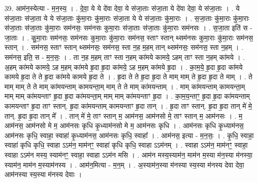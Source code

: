 \documentclass[17pt]{extarticle}
\begin{document}
39. आम॑न॒स्येत्या - म॒न॒स्य॒ । . दे॒वा॒ ये ये दे॑वा देवा॒ ये स॑जा॒ताः स॑जा॒ता ये दे॑वा देवा॒ ये स॑जा॒ताः । . ये स॑जा॒ताः स॑जा॒ता ये ये स॑जा॒ताः कु॑मा॒राः कु॑मा॒राः स॑जा॒ता ये ये स॑जा॒ताः कु॑मा॒राः । . स॒जा॒ताः कु॑मा॒राः कु॑मा॒राः स॑जा॒ताः स॑जा॒ताः कु॑मा॒राः सम॑नसः॒ सम॑नसः कुमा॒राः स॑जा॒ताः स॑जा॒ताः कु॑मा॒राः सम॑नसः । . स॒जा॒ता इति॑ स - जा॒ताः । . कु॒मा॒राः सम॑नसः॒ सम॑नसः कुमा॒राः कु॑मा॒राः सम॑नस॒ स्ताꣳ स्तान् थ्सम॑नसः कुमा॒राः कु॑मा॒राः सम॑नस॒ स्तान् । . सम॑नस॒ स्ताꣳ स्तान् थ्सम॑नसः॒ सम॑नस॒ स्ता न॒ह म॒हम् तान् थ्सम॑नसः॒ सम॑नस॒ स्ता न॒हम् । . सम॑नस॒ इति॒ स - म॒न॒सः॒ । . ता न॒ह म॒हम् ताꣳ स्ता न॒हम् का॑मये कामये॒ ऽहम् ताꣳ स्ता न॒हम् का॑मये । . अ॒हम् का॑मये कामये॒ ऽह म॒हम् का॑मये हृ॒दा हृ॒दा का॑मये॒ ऽह म॒हम् का॑मये हृ॒दा । . का॒म॒ये॒ हृ॒दा हृ॒दा का॑मये कामये हृ॒दा ते ते हृ॒दा का॑मये कामये हृ॒दा ते । . हृ॒दा ते ते हृ॒दा हृ॒दा ते माम् माम् ते हृ॒दा हृ॒दा ते माम् । . ते माम् माम् ते ते माम् का॑मयन्ताम् कामयन्ता॒म् माम् ते ते माम् का॑मयन्ताम् । . माम् का॑मयन्ताम् कामयन्ता॒म् माम् माम् का॑मयन्ताꣳ हृ॒दा हृ॒दा का॑मयन्ता॒म् माम् माम् का॑मयन्ताꣳ हृ॒दा । . का॒म॒य॒न्ताꣳ॒॒ हृ॒दा हृ॒दा का॑मयन्ताम् कामयन्ताꣳ हृ॒दा ताꣳ स्तान्. हृ॒दा का॑मयन्ताम् कामयन्ताꣳ हृ॒दा तान् । . हृ॒दा ताꣳ स्तान्. हृ॒दा हृ॒दा तान् मे॑ मे॒ तान्. हृ॒दा हृ॒दा तान् मे᳚ । . तान् मे॑ मे॒ ताꣳ स्तान् म॒ आम॑नस॒ आम॑नसो मे॒ ताꣳ स्तान् म॒ आम॑नसः । . म॒ आम॑नस॒ आम॑नसो मे म॒ आम॑नसः कृधि कृ॒ध्याम॑नसो मे म॒ आम॑नसः कृधि । . आम॑नसः कृधि कृ॒ध्याम॑नस॒ आम॑नसः कृधि॒ स्वाहा॒ स्वाहा॑ कृ॒ध्याम॑नस॒ आम॑नसः कृधि॒ स्वाहा᳚ । . आम॑नस॒ इत्या - म॒न॒सः॒ । . कृ॒धि॒ स्वाहा॒ स्वाहा॑ कृधि कृधि॒ स्वाहा ऽऽम॑न॒ माम॑नꣳ॒॒ स्वाहा॑ कृधि कृधि॒ स्वाहा ऽऽम॑नम् । . स्वाहा ऽऽम॑न॒ माम॑नꣳ॒॒ स्वाहा॒ स्वाहा ऽऽम॑न मस्य॒ स्याम॑नꣳ॒॒ स्वाहा॒ स्वाहा ऽऽम॑न मसि । . आम॑न मस्य॒स्याम॑न॒ माम॑न म॒स्या म॑न॒स्या म॑नस्या॒ स्याम॑न॒ माम॑न म॒स्याम॑नस्य । . आम॑न॒मित्या - म॒न॒म् । . अ॒स्याम॑न॒स्या म॑नस्या स्य॒स्या म॑नस्य देवा देवा॒ आम॑नस्या स्य॒स्या म॑नस्य देवाः । \newline
\pagebreak
{}
\end{document}
